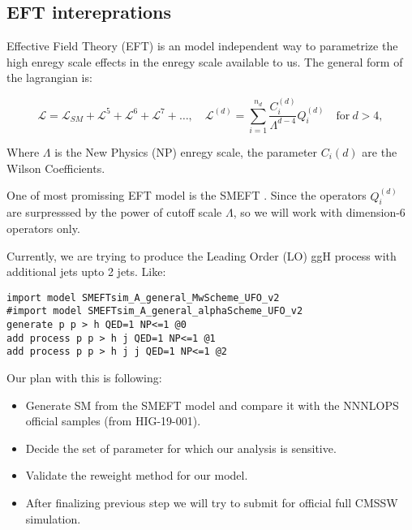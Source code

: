 \subsection{EFT intereprations}

Effective Field Theory (EFT) is an model independent way to parametrize the high enregy scale effects in the enregy scale available to us. The general form of the lagrangian is:

\begin{equation}
    \mathcal{L} = \mathcal{L}_{SM} + \mathcal{L}^{5} + \mathcal{L}^{6} + \mathcal{L}^{7} + \ldots,\quad \mathcal{L}^{(d)} = \sum_{i=1}^{n_d} \frac{C_i^{(d)}}{\Lambda^{d-4}}Q_i^{(d)} \quad \textrm{for}~ d>4,
\end{equation}

Where $\Lambda$ is the New Physics (NP) enregy scale, the parameter $C_{i}{(d)}$ are the Wilson Coefficients.

One of most promissing EFT model is the SMEFT \cite{Brivio:2017btx,Aebischer:2017ugx}. Since the operators $Q_{i}^{(d)}$ are surpresssed by the power of cutoff scale $\Lambda$, so we will work with dimension-6 operators only.

Currently, we are trying to produce the Leading Order (LO) ggH process with additional jets upto 2 jets. Like:

\begin{verbatim}
import model SMEFTsim_A_general_MwScheme_UFO_v2
#import model SMEFTsim_A_general_alphaScheme_UFO_v2
generate p p > h QED=1 NP<=1 @0
add process p p > h j QED=1 NP<=1 @1
add process p p > h j j QED=1 NP<=1 @2
\end{verbatim}

Our plan with this is following:

\begin{itemize}
    \item Generate SM from the SMEFT model and compare it with the NNNLOPS official samples (from HIG-19-001).
    \item Decide the set of parameter for which our analysis is sensitive.
    \item Validate the reweight method for our model.
    \item After finalizing previous step we will try to submit for official full CMSSW simulation.
\end{itemize}